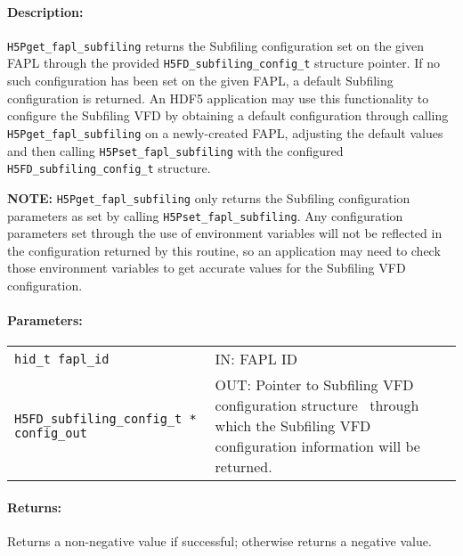 \documentclass[../main.tex]{subfiles}
\begin{document}
\paragraph{Description:}
\begin{flushleft}%
\texttt{H5Pget\_fapl\_subfiling} returns the Subfiling configuration set on
the given \Gls{FAPL} through the provided \texttt{H5FD\_subfiling\_config\_t}
structure pointer. If no such configuration has been set on the given FAPL,
a default Subfiling configuration is returned. An HDF5 application may use
this functionality to configure the Subfiling VFD by obtaining a default
configuration through calling \texttt{H5Pget\_fapl\_subfiling} on a newly-created
\Gls{FAPL}, adjusting the default values and then calling \texttt{H5Pset\_fapl\_subfiling}
with the configured \texttt{H5FD\_subfiling\_config\_t} structure.

\textbf{NOTE:} \texttt{H5Pget\_fapl\_subfiling} only returns the Subfiling
configuration parameters as set by calling \texttt{H5Pset\_fapl\_subfiling}.
Any configuration parameters set through the use of environment variables
will not be reflected in the configuration returned by this routine, so an
application may need to check those environment variables to get accurate
values for the Subfiling VFD configuration.
\end{flushleft}%

\paragraph{Parameters:}
\begin{flushleft}%
 \begin{tabular}{lp{}}%
   \texttt{hid\_t fapl\_id} & IN: \Gls{FAPL} ID \\
   \texttt{H5FD\_subfiling\_config\_t * config\_out} & OUT: Pointer to
   Subfiling VFD configuration structure \ through which the Subfiling VFD configuration
   information will be returned. \\
 \end{tabular}%
\end{flushleft}%

\paragraph{Returns:}
\begin{flushleft}%
Returns a non-negative value if successful; otherwise returns a negative value.
\end{flushleft}%
\end{document}
